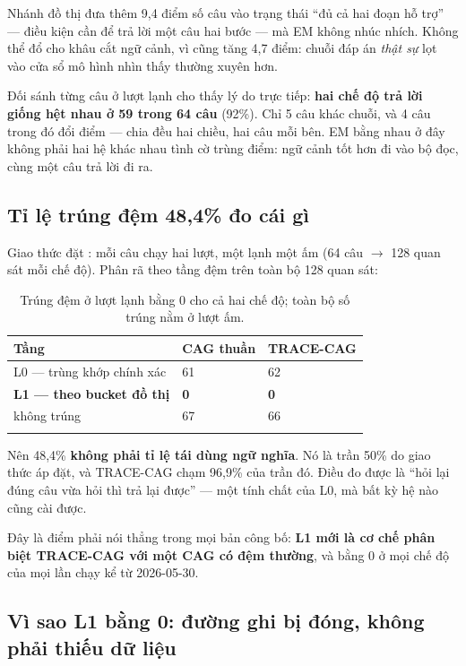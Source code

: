 Nhánh đồ thị đưa thêm 9,4 điểm số câu vào trạng thái ``đủ cả hai đoạn hỗ trợ'' --- điều
kiện cần để trả lời một câu hai bước --- mà EM không nhúc nhích. Không thể đổ cho khâu cắt
ngữ cảnh, vì  cũng tăng 4,7 điểm: chuỗi đáp án \emph{thật sự}
lọt vào cửa sổ mô hình nhìn thấy thường xuyên hơn.

Đối sánh từng câu ở lượt lạnh cho thấy lý do trực tiếp: \textbf{hai chế độ trả lời giống hệt
nhau ở 59 trong 64 câu} (92\%). Chỉ 5 câu khác chuỗi, và 4 câu trong đó đổi điểm --- chia
đều hai chiều, hai câu mỗi bên. EM bằng nhau ở đây không phải hai hệ khác nhau tình cờ trùng
điểm: ngữ cảnh tốt hơn đi vào bộ đọc, cùng một câu trả lời đi ra.

\subsection{Tỉ lệ trúng đệm 48,4\% đo cái gì}

Giao thức đặt : mỗi câu chạy hai lượt, một lạnh một ấm (64 câu
$\to$ 128 quan sát mỗi chế độ). Phân rã theo tầng đệm trên toàn bộ 128 quan sát:

\begin{longtable}{L{5.6cm} R{3.0cm} R{3.0cm}}
\toprule
\textbf{Tầng} & \textbf{CAG thuần} & \textbf{TRACE-CAG}\\
\midrule
\endhead
L0 --- trùng khớp chính xác & 61 & 62\\
\textbf{L1 --- theo bucket đồ thị} & \textbf{0} & \textbf{0}\\
không trúng & 67 & 66\\
\bottomrule
\caption{Trúng đệm ở lượt lạnh bằng 0 cho cả hai chế độ; toàn bộ số trúng nằm ở lượt ấm.}
\end{longtable}

Nên 48,4\% \textbf{không phải tỉ lệ tái dùng ngữ nghĩa}. Nó là trần 50\% do giao thức áp
đặt, và TRACE-CAG chạm 96,9\% của trần đó. Điều đo được là ``hỏi lại đúng câu vừa hỏi thì
trả lại được'' --- một tính chất của L0, mà bất kỳ hệ nào cũng cài được.

Đây là điểm phải nói thẳng trong mọi bản công bố: \textbf{L1 mới là cơ chế phân biệt
TRACE-CAG với một CAG có đệm thường}, và  bằng 0 ở mọi chế độ của mọi lần
chạy kể từ 2026-05-30.

\subsection{Vì sao L1 bằng 0: đường ghi bị đóng, không phải thiếu dữ liệu}

